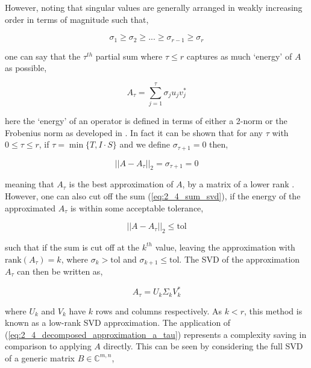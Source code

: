However, noting that singular values are generally arranged in weakly increasing
order in terms of magnitude such that,

\begin{equation}
    \sigma_1 \geq \sigma_2 \geq ... \geq \sigma_{r-1} \geq \sigma_r
\end{equation}

one can say that the $\tau^{th}$ partial sum where
$\tau \leq r$ captures as much `energy' of $A$ as possible,

\begin{equation}
    A_\tau = \sum_{j=1}^{\tau}\sigma_j u_j v_j^*
    \label{eq:2_4_sum_svd}
\end{equation}

here the `energy' of an operator is defined in terms of either a 2-norm or the
Frobenius norm as developed in \cite{Trefethen:1997:SIAM}. In fact it can be shown
that for any $\tau$ with $0 \leq \tau \leq r$, if $\tau = \min \{T, I \cdot S\}$
and we define $\sigma_{\tau + 1} = 0$ then,

\begin{equation}
    ||A - A_\tau ||_2 = \sigma_{\tau+1} = 0
\end{equation}

meaning that $A_\tau$ is the best approximation of $A$, by a matrix of a lower rank
\cite{Trefethen:1997:SIAM}. However, one can also cut off the sum (\ref{eq:2_4_sum_svd}),
if the energy of the approximated $A_\tau$ is within some acceptable tolerance,

\begin{equation}
    ||A - A_\tau ||_2  \leq  \text{tol}
    \label{eq:2_4_svd_tol}
\end{equation}

such that if the sum is cut off at the $k^{th}$ value, leaving the approximation with
$\text{rank}(A_\tau) = k$, where $\sigma_k > \text{tol}$ and
$\sigma_{k+1} \leq \text{tol}$. The \gls{SVD} of the approximation $A_\tau$ can
then be written as,

\begin{equation}
    A_\tau = U_k \Sigma_k V_k^*
    \label{eq:2_4_decomposed_approximation_a_tau}
\end{equation}

where $U_k$ and $V_k$ have $k$ rows and columns respectively. As $k < r$, this
method is known as a low-rank SVD approximation. The application of
(\ref{eq:2_4_decomposed_approximation_a_tau}) represents a complexity saving in
comparison to applying $A$ directly. This can be seen by considering the full
SVD of a generic matrix $B \in \mathbb{C}^{m, n}$,

